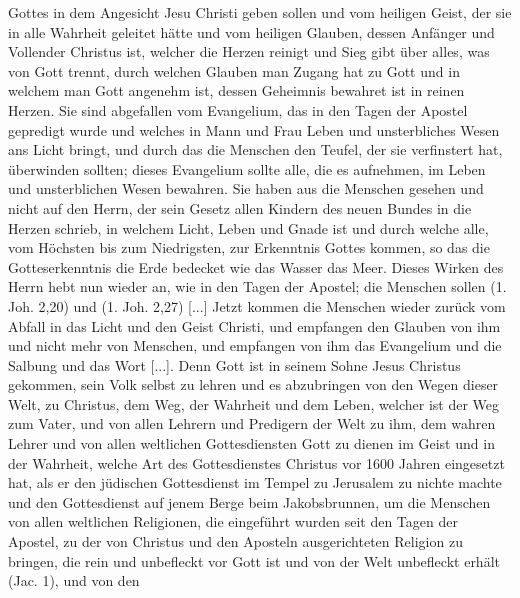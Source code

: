 {  Gottes in dem Angesicht Jesu Christi geben sollen und vom heiligen
  Geist, der sie in alle Wahrheit geleitet hätte und vom heiligen
  Glauben, dessen Anfänger und Vollender Christus ist, welcher
  die Herzen reinigt und Sieg gibt über alles, was von Gott trennt,
  durch welchen Glauben man Zugang hat zu Gott und in welchem
  man Gott angenehm ist, dessen Geheimnis bewahret ist in reinen
  Herzen. Sie sind abgefallen vom Evangelium, das in den Tagen
  der Apostel gepredigt wurde und welches in Mann und Frau
  Leben und unsterbliches Wesen ans Licht bringt, und durch das
  die Menschen den Teufel, der sie verfinstert hat, überwinden
  sollten; dieses Evangelium sollte alle, die es aufnehmen, im Leben
  und unsterblichen Wesen bewahren. Sie haben aus die Menschen
  gesehen und nicht auf den Herrn, der sein Gesetz allen Kindern
  des neuen Bundes in die Herzen schrieb, in welchem Licht, Leben
  und Gnade ist und durch welche alle, vom Höchsten bis zum
  Niedrigsten, zur Erkenntnis Gottes kommen, so das die 
  Gotteserkenntnis die Erde bedecket wie das Wasser das Meer. Dieses
  Wirken des Herrn hebt nun wieder an, wie in den Tagen der
  Apostel; die Menschen sollen  
  (1. Joh. 2,20) und 
   (1. Joh. 2,27) 
  [...] Jetzt kommen die Menschen wieder
  zurück vom Abfall in das Licht und den Geist Christi, und
  empfangen den Glauben von ihm und nicht mehr von Menschen,
  und empfangen von ihm das Evangelium und die Salbung und
  das Wort [...]. Denn Gott ist in seinem Sohne Jesus Christus
  gekommen, sein Volk selbst zu lehren und es abzubringen von
  den Wegen dieser Welt, zu Christus, dem Weg, der Wahrheit
  und dem Leben, welcher ist der Weg zum Vater, und von allen
  Lehrern und Predigern der Welt zu ihm, dem wahren Lehrer
  und von allen weltlichen Gottesdiensten Gott zu dienen
  im Geist und in der Wahrheit, welche Art des Gottesdienstes
  Christus vor 1600 Jahren eingesetzt hat, als er den jüdischen
  Gottesdienst im Tempel zu Jerusalem 
  zu nichte machte und den
  Gottesdienst auf jenem Berge beim Jakobsbrunnen, um die
  Menschen von allen weltlichen Religionen, die eingeführt wurden
  seit den Tagen der Apostel, zu der von Christus und den Aposteln
  ausgerichteten Religion zu bringen, die rein und unbefleckt vor
  Gott ist und von der Welt unbefleckt erhält (Jac. 1), und von den
}
